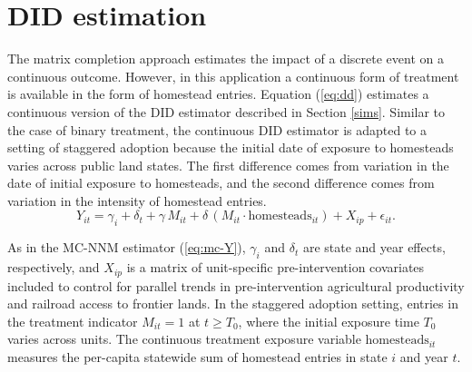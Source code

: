 \documentclass[12pt]{article}
\begin{document}
\section{DID estimation} \label{DID}

The matrix completion approach estimates the impact of a discrete event on a continuous outcome. However, in this application a continuous form of treatment is available in the form of homestead entries. Equation (\ref{eq:dd}) estimates a continuous version of the DID estimator described in Section \ref{sims}. Similar to the case of binary treatment, the continuous DID estimator is adapted to a setting of staggered adoption because the initial date of exposure to homesteads varies across public land states. The first difference comes from variation in the date of initial exposure to homesteads, and the second difference comes from variation in the intensity of homestead entries.
%
\begin{equation} 
Y_{it} =  \gamma_i + \delta_t + \gamma \, M_{it} + \delta \, (M_{it} \cdot \text{homesteads}_{it}) + X_{ip}  + \epsilon_{it}. \label{eq:dd} 
\end{equation}

As in the MC-NNM estimator (\ref{eq:mc-Y}), $\gamma_i$ and $\delta_t$ are state and year effects, respectively, and $X_{ip}$ is a matrix of unit-specific pre-intervention covariates included to control for parallel trends in pre-intervention agricultural productivity and railroad access to frontier lands. In the staggered adoption setting, entries in the treatment indicator $M_{it} = 1$ at $t \geq T_0$, where the initial exposure time $T_0$ varies across units. The continuous treatment exposure variable $\text{homesteads}_{it}$ measures the per-capita statewide sum of homestead entries in state $i$ and year $t$.
\end{document}

